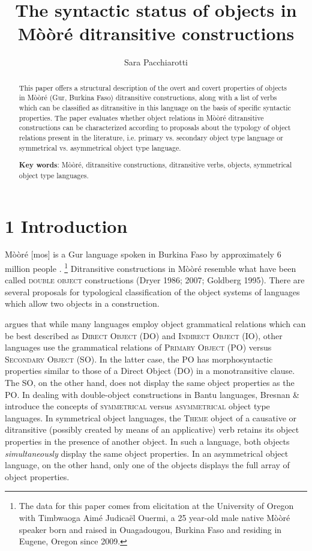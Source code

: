 \documentclass[output=paper]{langsci/langscibook}
\title{The syntactic status of objects in {Mòòré} ditransitive constructions}
\author{%
 Sara Pacchiarotti\affiliation{University of Oregon}
}
\begin{document}
\begin{abstract}
This paper offers a structural description of the overt and covert properties of objects in M\`{o}\`{o}r\'{e} (Gur, Burkina Faso) ditransitive constructions, along with a list of verbs which can be classified as ditransitive in this language on the basis of specific syntactic properties. The paper evaluates whether object relations in M\`{o}\`{o}r\'{e} ditransitive constructions can be characterized according to proposals about the typology of object relations present in the literature, i.e. primary vs. secondary object type language or symmetrical vs. asymmetrical object type language. 
\end{abstract}

\begin{abstract}
\textbf{Key words}: M\`{o}\`{o}r\'{e}, ditransitive constructions, ditransitive verbs, objects, symmetrical object type languages.  
\end{abstract}

\chapter[1 Introduction]{1 Introduction}

M\`{o}\`{o}r\'{e} [mos] is a Gur language spoken in Burkina Faso by approximately 6 million people \citep{LewisEtAl2016}.{ }\footnote{ The data for this paper comes from elicitation at the University of Oregon with Timbwaoga Aim\'{e} Judicaël Ouermi, a 25 year-old male native Mò\`{o}ré speaker born and raised in Ouagadougou, Burkina Faso and residing in Eugene, Oregon since 2009.}\textsuperscript{ } Ditransitive constructions in M\`{o}\`{o}r\'{e} resemble what have been called \textsc{double object} constructions (Dryer 1986; 2007; Goldberg 1995). There are several proposals for typological classification of the object systems of languages which allow two objects in a construction.

\citet{Dryer1986} argues that while many languages employ object grammatical relations which can be best described as \textsc{Direct Object} (DO) and \textsc{Indirect Object }(IO), other languages use the grammatical relations of \textsc{Primary Object} (PO) versus \textsc{Secondary Object} (SO). In the latter case, the PO has morphosyntactic properties similar to those of a Direct Object (DO) in a monotransitive clause. The SO, on the other hand, does not display the same object properties as the PO. In dealing with double-object constructions in Bantu languages, Bresnan \& \citet{Moshi1990} introduce the concepts of \textsc{symmetrical} versus \textsc{asymmetrical} object type languages. In symmetrical object languages, the \textsc{Theme} object of a causative or ditransitive (possibly created by means of an applicative) verb retains its object properties in the presence of another object. In such a language, both objects \textit{simultaneously }display the same object properties. In an asymmetrical object language, on the other hand, only one of the objects displays the full array of object properties. 
\end{document}
